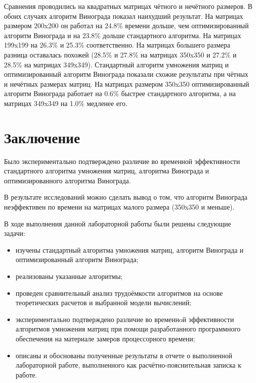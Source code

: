 \documentclass[a4paper,14pt, unknownkeysallowed]{extreport}
\begin{document}
Сравнения проводились на квадратных матрицах чётного и нечётного размеров. В обоих случаях алгоритм Винограда показал наихудший результат. На матрицах размером 200x200 он работал на 24.8\% времени дольше, чем оптимизированный алгоритм Винограда и на 23.8\% дольше стандартного алгоритма. На матрицах 199x199 на 26.3\% и 25.3\% соответственно. На матрицах большего размера разница оставалась похожей (28.5\% и 27.8\% на матрицах 350x350 и 27.2\% и 28.5\% на матрицах 349x349). Стандартный алгоритм умножения матриц и оптимизированный алгоритм Винограда показали схожие результаты при чётных и нечётных размерах матриц. На матрицах размером 350x350 оптимизированный алгоритм Винограда работает на 0.6\% быстрее стандартного алгоритма, а на матрицах 349x349 на 1.0\% медленее его. 
 

\chapter*{Заключение}

Было экспериментально подтверждено различие во временной эффективности стандартного алгоритма умножения матриц, алгоритма Винограда и оптимизированного алгоритма Винограда.

В результате исследований можно сделать вывод о том, что алгоритм Винограда неэффективен по времени на матрицах малого размера (350x350 и меньше).

\vspace{5mm}

В ходе выполнения данной лабораторной работы были решены следующие задачи:
\begin{itemize}
	\item изучены стандартный алгоритма умножения матриц, алгоритм Винограда и оптимизированный алгоритм Винограда;
	\item реализованы указанные алгоритмы;
	\item проведен сравнительный анализ трудоёмкости алгоритмов на основе теоретических расчетов и выбранной модели вычислений;
	\item экспериментально подтверждено различие во временнoй эффективности алгоритмов умножения матриц при помощи разработанного программного обеспечения на материале замеров процессорного времени;
	\item описаны и обоснованы полученные результаты в отчете о выполненной лабораторной работе, выполненного как расчётно-пояснительная записка к работе.
\end{itemize}
\end{document}

